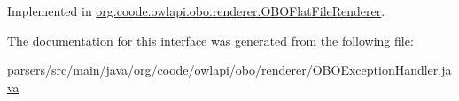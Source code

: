 Implemented in \hyperlink{classorg_1_1coode_1_1owlapi_1_1obo_1_1renderer_1_1_o_b_o_flat_file_renderer_ab370a327c93ce74a98e1a243cef82e84}{org.\-coode.\-owlapi.\-obo.\-renderer.\-O\-B\-O\-Flat\-File\-Renderer}.



The documentation for this interface was generated from the following file\-:\begin{DoxyCompactItemize}
\item 
parsers/src/main/java/org/coode/owlapi/obo/renderer/\hyperlink{_o_b_o_exception_handler_8java}{O\-B\-O\-Exception\-Handler.\-java}\end{DoxyCompactItemize}
